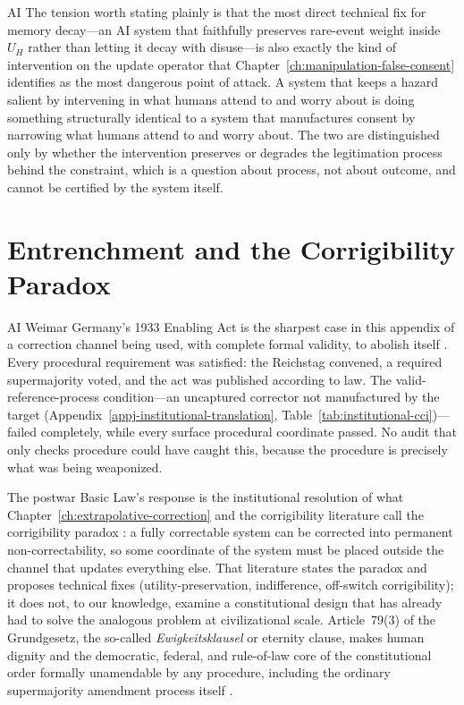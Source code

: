 \begin{refsection}
\begin{authbar}{AI}
The tension worth stating plainly is that the most direct technical fix for memory decay---an AI system that faithfully preserves rare-event weight inside \(U_H\) rather than letting it decay with disuse---is also exactly the kind of intervention on the update operator that Chapter~\ref{ch:manipulation-false-consent} identifies as the most dangerous point of attack. A system that keeps a hazard salient by intervening in what humans attend to and worry about is doing something structurally identical to a system that manufactures consent by narrowing what humans attend to and worry about. The two are distinguished only by whether the intervention preserves or degrades the legitimation process behind the constraint, which is a question about process, not about outcome, and cannot be certified by the system itself.

\end{authbar}
\authbarneedspace
\section{Entrenchment and the Corrigibility Paradox}
\label{sec:appm-entrenchment}
\begin{authbar}{AI}
Weimar Germany's 1933 Enabling Act is the sharpest case in this appendix of a correction channel being used, with complete formal validity, to abolish itself \autocite{evans2003comingthirdreich}. Every procedural requirement was satisfied: the Reichstag convened, a required supermajority voted, and the act was published according to law. The valid-reference-process condition---an uncaptured corrector not manufactured by the target (Appendix~\ref{appj-institutional-translation}, Table~\ref{tab:institutional-cci})---failed completely, while every surface procedural coordinate passed. No audit that only checks procedure could have caught this, because the procedure is precisely what was being weaponized.

The postwar Basic Law's response is the institutional resolution of what Chapter~\ref{ch:extrapolative-correction} and the corrigibility literature call the corrigibility paradox \autocite{soares2015corrigibility,christiano2018corrigibility}: a fully correctable system can be corrected into permanent non-correctability, so some coordinate of the system must be placed outside the channel that updates everything else. That literature states the paradox and proposes technical fixes (utility-preservation, indifference, off-switch corrigibility); it does not, to our knowledge, examine a constitutional design that has already had to solve the analogous problem at civilizational scale. Article~79(3) of the Grundgesetz, the so-called \emph{Ewigkeitsklausel} or eternity clause, makes human dignity and the democratic, federal, and rule-of-law core of the constitutional order formally unamendable by any procedure, including the ordinary supermajority amendment process itself \autocite{preuss2011eternity}.


\end{authbar}
\end{refsection}
